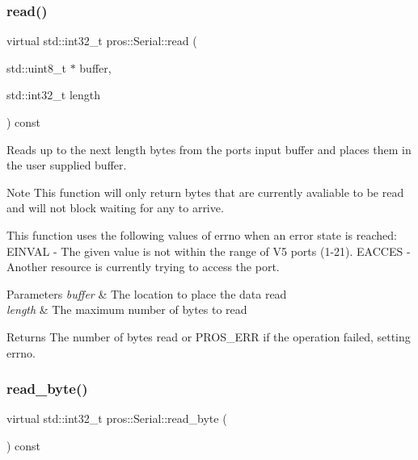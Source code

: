 \subsubsection{\texorpdfstring{read()}{read()}}
{\footnotesize\ttfamily virtual std\+::int32\+\_\+t pros\+::\+Serial\+::read (\begin{DoxyParamCaption}\item[{std\+::uint8\+\_\+t $\ast$}]{buffer,  }\item[{std\+::int32\+\_\+t}]{length }\end{DoxyParamCaption}) const\hspace{0.3cm}{\ttfamily [virtual]}}

Reads up to the next length bytes from the port\textquotesingle{}s input buffer and places them in the user supplied buffer.

\begin{DoxyNote}{Note}
This function will only return bytes that are currently avaliable to be read and will not block waiting for any to arrive.
\end{DoxyNote}
This function uses the following values of errno when an error state is reached\+: E\+I\+N\+V\+AL -\/ The given value is not within the range of V5 ports (1-\/21). E\+A\+C\+C\+ES -\/ Another resource is currently trying to access the port.


\begin{DoxyParams}{Parameters}
{\em buffer} & The location to place the data read \\
\hline
{\em length} & The maximum number of bytes to read\\
\hline
\end{DoxyParams}
\begin{DoxyReturn}{Returns}
The number of bytes read or P\+R\+O\+S\+\_\+\+E\+RR if the operation failed, setting errno. 
\end{DoxyReturn}
\mbox{\label{classpros_1_1Serial_a59c62f236867ec160668389a47d09a5e}} 
\subsubsection{\texorpdfstring{read\+\_\+byte()}{read\_byte()}}
{\footnotesize\ttfamily virtual std\+::int32\+\_\+t pros\+::\+Serial\+::read\+\_\+byte (\begin{DoxyParamCaption}{ }\end{DoxyParamCaption}) const\hspace{0.3cm}{\ttfamily [virtual]}}

